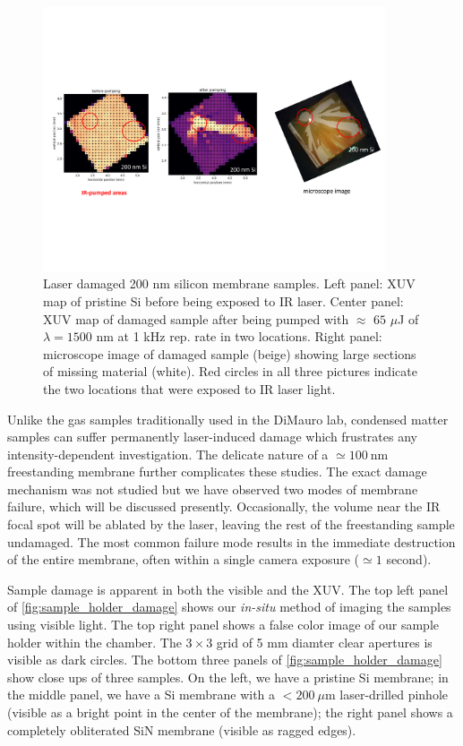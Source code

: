 \begin{figure}
	\centering
	\includegraphics[width=0.9\textwidth]{figures/chap4/Si_damage.pdf}
	\caption{Laser damaged 200 nm silicon membrane samples. Left panel: XUV map of pristine Si before being exposed to IR laser. Center panel: XUV map of damaged sample after being pumped with $\approx \text{ 65 }\mu$J of $\lambda = 1500 \text{ nm}$ at 1 kHz rep. rate in two locations. Right panel: microscope image of damaged sample (beige) showing large sections of missing material (white). Red circles in all three pictures indicate the two locations that were exposed to IR laser light.}
	\label{fig:Si_damage}
\end{figure}

Unlike the gas samples traditionally used in the DiMauro lab, condensed matter samples can suffer permanently laser-induced damage which frustrates any intensity-dependent investigation. The delicate nature of a $\simeq 100 \ \textrm{nm}$ freestanding membrane further complicates these studies. The exact damage mechanism was not studied but we have observed two modes of membrane failure, which will be discussed presently. Occasionally, the volume near the IR focal spot will be ablated by the laser, leaving the rest of the freestanding sample undamaged. The most common failure mode results in the immediate destruction of the entire membrane, often within a single camera exposure ($\simeq 1$ second).

Sample damage is apparent in both the visible and the XUV. The top left panel of \cref{fig:sample_holder_damage} shows our \textit{in-situ} method of imaging the samples using visible light. The top right panel shows a false color image of our sample holder within the chamber. The $3 \times 3$ grid of 5 mm diamter clear apertures is visible as dark circles. The bottom three panels of \cref{fig:sample_holder_damage} show close ups of three samples. On the left, we have a pristine Si membrane; in the middle panel, we have a Si membrane with a $<200 \ \mu \textrm{m}$ laser-drilled pinhole (visible as a bright point in the center of the membrane); the right panel shows a completely obliterated SiN membrane (visible as ragged edges).

